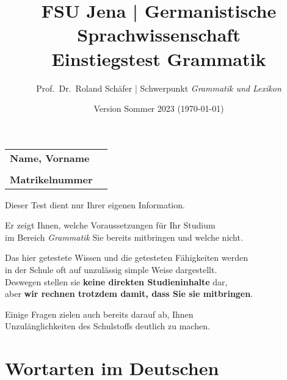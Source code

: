 \documentclass[12pt,a4paper,twoside]{article}
\author{Prof.\ Dr.\ Roland Schäfer | Schwerpunkt \textit{Grammatik und Lexikon}}
\title{FSU Jena | Germanistische Sprachwissenschaft\\Einstiegstest Grammatik}
\date{Version Sommer 2023 (\today)}
\newcommand{\Zeile}{\vspace{\baselineskip}}
\begin{document}
\maketitle
\thispagestyle{empty}

\begin{tabular}[h]{lp{8cm}}
  \textbf{Name, Vorname} & \\\cline{2-2}
  &\\
  \textbf{Matrikelnummer} & \\\cline{2-2}
\end{tabular}

\vspace{2cm}

\begin{center}

  \Zeile

  \Large{Dieser Test dient nur Ihrer eigenen Information.\\

    \Zeile

  Er zeigt Ihnen, welche Voraussetzungen für Ihr Studium\\
  im Bereich \textit{Grammatik} Sie bereits mitbringen und welche nicht.\\

  \Zeile

  Das hier getestete Wissen und die getesteten Fähigkeiten werden\\
  in der Schule oft auf unzulässig simple Weise dargestellt.\\
  Deswegen stellen sie \textbf{keine direkten Studieninhalte} dar,\\
  aber \textbf{wir rechnen trotzdem damit, dass Sie sie mitbringen}.\\
  
  \Zeile

  Einige Fragen zielen auch bereits darauf ab, Ihnen\\
  Unzulänglichkeiten des Schulstoffs deutlich zu machen.
}
\end{center}

\newpage
\setcounter{page}{1}
\fancyfoot[C]{\thepage}



\section{Wortarten im Deutschen}
\end{document}
